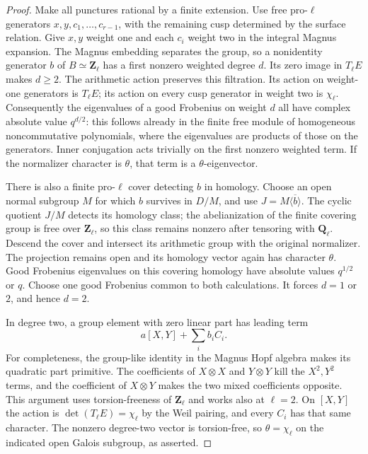 \begin{proof}
Make all punctures rational by a finite extension.
Use free pro-$\ell$ generators $x,y,c_1,\ldots,c_{r-1}$,
with the remaining cusp determined by the surface
relation.  Give $x,y$ weight one and each $c_i$
weight two in the integral Magnus expansion.  The
Magnus embedding separates the group, so a nonidentity
generator $b$ of $B\simeq\mathbf Z_\ell$ has a
first nonzero weighted degree $d$.  Its zero image in
$T_\ell E$ makes $d\ge2$.  The arithmetic action
preserves this filtration.  Its action on weight-one
generators is $T_\ell E$; its action on every cusp
generator in weight two is $\chi_\ell$.  Consequently
the eigenvalues of a good Frobenius on weight $d$
all have complex absolute value $q^{d/2}$: this
follows already in the finite free module of
homogeneous noncommutative polynomials, where the
eigenvalues are products of those on the generators.
Inner conjugation acts trivially on the first
nonzero weighted term.  If the normalizer character
is $\theta$, that term is a $\theta$-eigenvector.

There is also a finite pro-$\ell$ cover detecting
$b$ in homology.  Choose an open normal subgroup
$M$ for which $b$ survives in $D/M$, and use
$J=M\overline{\langle b\rangle}$.  The cyclic
quotient $J/M$ detects its homology class; the
abelianization of the finite covering group is free
over $\mathbf Z_\ell$, so this class remains
nonzero after tensoring with $\mathbf Q_\ell$.
Descend the cover and intersect its arithmetic group
with the original normalizer.  The projection remains
open and its homology vector again has character
$\theta$.  Good Frobenius eigenvalues on this covering
homology have absolute values $q^{1/2}$ or $q$.
Choose one good Frobenius common to both calculations.
It forces $d=1$ or $2$, and hence $d=2$.

In degree two, a group element with zero linear part
has leading term
\[
                a[X,Y]+\sum_i b_i C_i.
\]
For completeness, the group-like identity in the
Magnus Hopf algebra makes its quadratic part primitive.
The coefficients of $X\otimes X$ and $Y\otimes Y$
kill the $X^2,Y^2$ terms, and the coefficient of
$X\otimes Y$ makes the two mixed coefficients
opposite.  This argument uses torsion-freeness of
$\mathbf Z_\ell$ and works also at $\ell=2$.
On $[X,Y]$ the action is
$\det(T_\ell E)=\chi_\ell$ by the Weil pairing,
and every $C_i$ has that same character.  The
nonzero degree-two vector is torsion-free, so
$\theta=\chi_\ell$ on the indicated open Galois
subgroup, as asserted.
\end{proof}

